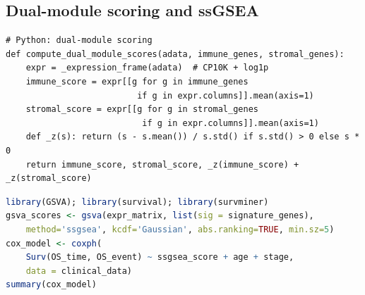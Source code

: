 \documentclass[12pt, a4paper]{article}
\begin{document}
\subsection{Dual-module scoring and ssGSEA}

\begin{lstlisting}[caption={Dual-module score computation (Python) and ssGSEA scoring (R)}]
# Python: dual-module scoring
def compute_dual_module_scores(adata, immune_genes, stromal_genes):
    expr = _expression_frame(adata)  # CP10K + log1p
    immune_score = expr[[g for g in immune_genes
                          if g in expr.columns]].mean(axis=1)
    stromal_score = expr[[g for g in stromal_genes
                           if g in expr.columns]].mean(axis=1)
    def _z(s): return (s - s.mean()) / s.std() if s.std() > 0 else s * 0
    return immune_score, stromal_score, _z(immune_score) + _z(stromal_score)
\end{lstlisting}

\begin{lstlisting}[language=R, caption={ssGSEA and multivariable Cox regression (R)}]
library(GSVA); library(survival); library(survminer)
gsva_scores <- gsva(expr_matrix, list(sig = signature_genes),
    method='ssgsea', kcdf='Gaussian', abs.ranking=TRUE, min.sz=5)
cox_model <- coxph(
    Surv(OS_time, OS_event) ~ ssgsea_score + age + stage,
    data = clinical_data)
summary(cox_model)
\end{lstlisting}



\end{document}
